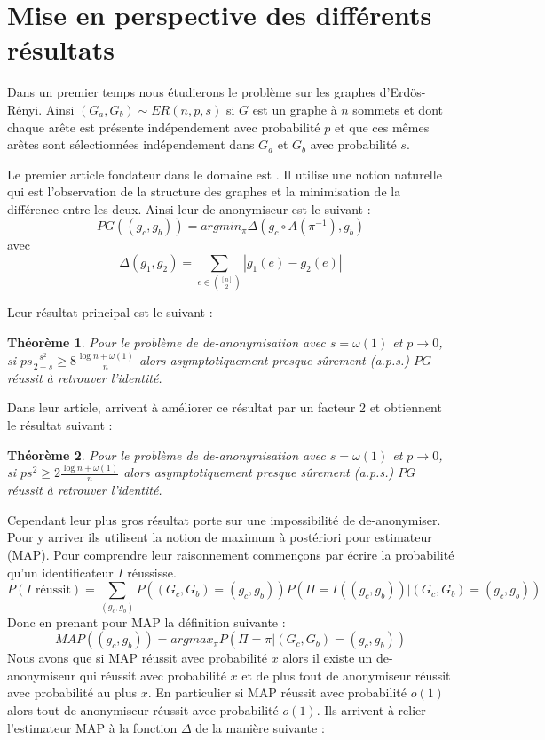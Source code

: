 \documentclass[letterpaper,10pt]{llncs}
\newtheorem{theoreme}{Théorème}
\begin{document}
\section{Mise en perspective des différents résultats}

Dans un premier temps nous étudierons le problème sur les graphes d'Erdös-Rényi. Ainsi $(G_a,G_b) \sim ER(n,p,s)$ si $G$ est un graphe à $n$ sommets et dont chaque arête est présente indépendement avec probabilité $p$ et que ces mêmes arêtes sont sélectionnées indépendement dans $G_a$ et $G_b$ avec probabilité $s$.

Le premier article fondateur dans le domaine est \cite{Pedarsani:2011:PAN:2020408.2020596}. Il utilise une notion naturelle qui est l'observation de la structure des graphes et la minimisation de la différence entre les deux. Ainsi leur de-anonymiseur est le suivant :
\[
PG((g_c,g_b)) = argmin_{\pi} \Delta(g_c \circ A(\pi^{-1}), g_b)
\]
avec
\[
\Delta(g_1,g_2) = \sum_{e \in \binom{[n]}{2}} |g_1(e)-g_2(e)|
\]

Leur résultat principal est le suivant :

\begin{theoreme}
Pour le problème de de-anonymisation avec $s = \omega(1)$ et $p \rightarrow 0$, si $ps \frac{s^2}{2-s} \geq 8\frac{\log n + \omega(1)}{n}$ alors asymptotiquement presque sûrement (a.p.s.) $PG$ réussit à retrouver l'identité.
\end{theoreme}

Dans leur article, \cite{Cullina:2016:IAC:2964791.2901460} arrivent à améliorer ce résultat par un facteur 2 et obtiennent le résultat suivant :

\begin{theoreme}
Pour le problème de de-anonymisation avec $s = \omega(1)$ et $p \rightarrow 0$, si $ps^2 \geq 2\frac{\log n + \omega(1)}{n}$ alors asymptotiquement presque sûrement (a.p.s.) $PG$ réussit à retrouver l'identité.
\end{theoreme}

Cependant leur plus gros résultat porte sur une impossibilité de de-anonymiser. Pour y arriver ils utilisent la notion de maximum à postériori pour estimateur (MAP). Pour comprendre leur raisonnement commençons par écrire la probabilité qu'un identificateur $I$ réussisse.
\[
P(I \text{ réussit}) = \sum_{(g_c,g_b)} P((G_c,G_b) = (g_c,g_b)) P(\Pi = I((g_c,g_b)) |(G_c,G_b) = (g_c,g_b))
\]
Donc en prenant pour MAP la définition suivante :
\[
MAP((g_c,g_b))= argmax_{\pi} P(\Pi = \pi |(G_c,G_b) = (g_c,g_b))
\]
Nous avons que si MAP réussit avec probabilité $x$ alors il existe un de-anonymiseur qui réussit avec probabilité $x$ et de plus tout de anonymiseur réussit avec probabilité au plus $x$. En particulier si MAP réussit avec probabilité $o(1)$ alors tout de-anonymiseur réussit avec probabilité $o(1)$.
Ils arrivent à relier l'estimateur MAP à la fonction $\Delta$ de la manière suivante :
\end{document}

